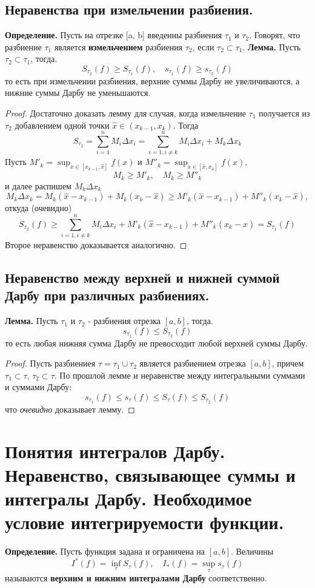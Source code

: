 \documentclass{article}
\newcommand*{\lemma}[1]{\textbf{Лемма.} #1. \newline}
\newcommand*{\definition}[1]{\textbf{Определение.} #1 \newline}
\begin{document}
\subsection{Неравенства при измельчении разбиения.}
\definition{Пусть на отрезке [a, b] введенны разбиения $\tau_1$ и $\tau_2$. Говорят, что разбиение $\tau_1$ является \textbf{измельчением} разбиения $\tau_2$, если $\tau_2 \subset \tau_1$.}
\newline 
\lemma{Пусть $\tau_2 \subset \tau_1$, тогда}
$$
    S_{\tau_2}(f) \geq S_{\tau_1}(f), \quad s_{\tau_1}(f) \geq s_{\tau_2}(f)
$$
то есть при измельчении разбиения, верхние суммы Дарбу не увеличиваются, а нижние суммы Дарбу не уменьшаются.
\begin{proof}
    Достаточно доказать лемму для случая, когда измельчение $\tau_1$ получается из $\tau_2$ добавлением одной точки $\hat{x} \in (x_{k-1}, x_k)$. Тогда
    $$
        S_{\tau_2} = \sum_{i = 1}^{n} M_i \Delta x_i = \sum_{i = 1, i \neq k}^{n}M_i \Delta x_i + M_k \Delta x_k
    $$
    Пусть $M'_k = \displaystyle \sup_{x \in [x_{k-1}, \hat{x}]}f(x)$ и $M''_k = \displaystyle \sup_{x \in [\hat{x}, x_k]}f(x)$,
    $$  
        M_k \geq M'_k, \quad M_k \geq M''_k
    $$
    и далее распишем $M_k \Delta x_k$
    $$
        M_k \Delta x_k = M_k(\hat{x} - x_{k - 1}) + M_k(x_k - \hat{x}) \geq M'_k(\hat{x} - x_{k - 1}) + M''_k(x_k - \hat{x}),
    $$
    откуда (очевидно)
    $$
        S_{\tau_2}(f) \geq \sum_{i = 1, i \neq k}^{n} M_i \Delta x_i + M'_k(\hat{x} - x_{k - 1}) + M''_k(x_k - \hat{x}) = S_{\tau_1}(f)
    $$
    Второе неравенство доказывается аналогично.
\end{proof}
\subsection{Неравенство между верхней и нижней суммой Дарбу при различных разбиениях.}
\lemma{Пусть $\tau_1$ и $\tau_2$ - разбиения отрезка $[a, b]$, тогда}
$$
    s_{\tau_1}(f) \leq S_{\tau_2}(f)
$$
то есть любая нижняя сумма Дарбу не превосходит любой верхней суммы Дарбу.
\begin{proof}
    Пусть разбиениея $\tau = \tau_1 \cup \tau_2$ является разбиением отрезка $[a, b]$, причем $\tau_1 \subset \tau$, $\tau_2 \subset \tau$. По прошлой лемме и неравенстве между интегральными суммами и суммами Дарбу:
    $$
        s_{\tau_1}(f) \leq s_\tau(f) \leq S_\tau(f) \leq S_{\tau_2}(f)
    $$
    что \textit{очевидно} доказывает лемму.
\end{proof}
\section{Понятия интегралов Дарбу. Неравенство, связывающее суммы и интегралы Дарбу. Необходимое условие интегрируемости функции.}
\definition{Пусть функция задана и ограничена на $[a, b]$. Величины}
$$
    I^*(f) = \displaystyle \inf_{\tau}S_\tau(f), \quad I_*(f) = \sup_{\tau}s_\tau(f) 
$$
называются \textbf{верхним и нижним интегралами Дарбу} соответственно.
\end{document}
